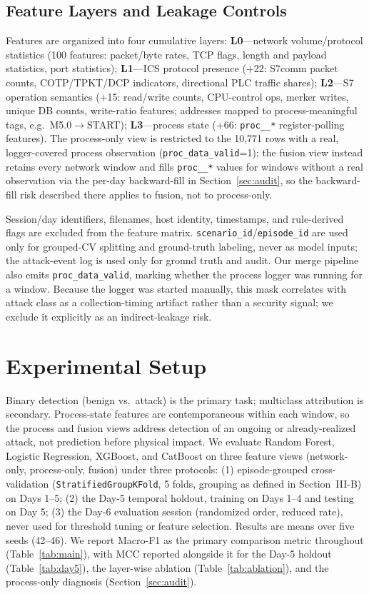 \documentclass[conference]{IEEEtran}
\begin{document}
\subsection{Feature Layers and Leakage Controls}

Features are organized into four cumulative layers: \textbf{L0}---network volume/protocol statistics (100
features: packet/byte rates, TCP flags, length and payload statistics, port statistics);
\textbf{L1}---ICS protocol presence (+22: S7comm packet counts, COTP/TPKT/DCP indicators, directional PLC
traffic shares); \textbf{L2}---S7 operation semantics (+15: read/write counts, CPU-control ops, merker
writes, unique DB counts, write-ratio features; addresses mapped to process-meaningful tags, e.g.\
M5.0$\rightarrow$START); \textbf{L3}---process state (+66: \texttt{proc\_\_*} register-polling features).
The process-only view is restricted to the 10{,}771 rows with a real, logger-covered process observation
(\texttt{proc\_data\_valid}=1); the fusion view instead retains every network window and fills
\texttt{proc\_\_*} values for windows without a real observation via the per-day backward-fill in
Section~\ref{sec:audit}, so the backward-fill risk described there applies to fusion, not to process-only.

Session/day identifiers, filenames, host identity, timestamps, and rule-derived flags are excluded from
the feature matrix. \texttt{scenario\_id}/\texttt{episode\_id} are used only for grouped-CV splitting and
ground-truth labeling, never as model inputs; the attack-event log is used only for ground truth and
audit. Our merge pipeline also emits \texttt{proc\_data\_valid}, marking whether the process logger was
running for a window. Because the logger was started manually, this mask correlates with attack class as
a collection-timing artifact rather than a security signal; we exclude it explicitly as an
indirect-leakage risk.

\section{Experimental Setup}

Binary detection (benign vs.\ attack) is the primary task; multiclass attribution is secondary.
Process-state features are contemporaneous within each window, so the process and fusion views address
detection of an ongoing or already-realized attack, not prediction before physical impact. We evaluate
Random Forest, Logistic Regression, XGBoost, and CatBoost on three feature views (network-only,
process-only, fusion) under three protocols: (1) episode-grouped cross-validation
(\texttt{StratifiedGroupKFold}, 5 folds, grouping as defined in Section~III-B) on Days 1--5; (2) the Day-5
temporal holdout, training on Days 1--4 and testing on Day 5; (3) the Day-6 evaluation session
(randomized order, reduced rate), never used for threshold tuning or feature selection. Results are means
over five seeds (42--46). We report Macro-F1 as the primary comparison metric throughout
(Table~\ref{tab:main}), with MCC reported alongside it for the Day-5 holdout (Table~\ref{tab:day5}), the
layer-wise ablation (Table~\ref{tab:ablation}), and the process-only diagnosis
(Section~\ref{sec:audit}).
\end{document}
